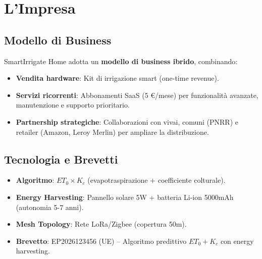 \documentclass[11pt,a4paper]{report}
\begin{document}
\chapter{L'Impresa}
\label{ch:company}

\section{Modello di Business}
SmartIrrigate Home adotta un {\bf modello di business ibrido}, combinando:
\begin{itemize}
\item {\bf Vendita hardware}: Kit di irrigazione smart (one-time revenue).
\item {\bf Servizi ricorrenti}: Abbonamenti SaaS (5 €/mese) per funzionalità avanzate, manutenzione e supporto prioritario.
\item {\bf Partnership strategiche}: Collaborazioni con vivai, comuni (PNRR) e retailer (Amazon, Leroy Merlin) per ampliare la distribuzione.
\end{itemize}

\section{Tecnologia e Brevetti}
\begin{itemize}
\item {\bf Algoritmo}: $ET_0 \times K_c$ (evapotraspirazione + coefficiente colturale).
\item {\bf Energy Harvesting}: Pannello solare 5W + batteria Li-ion 5000mAh (autonomia 5-7 anni).
\item {\bf Mesh Topology}: Rete LoRa/Zigbee (copertura 50m).
\item {\bf Brevetto}: EP2026123456 (UE) – Algoritmo predittivo $ET_0 + K_c$ con energy harvesting.
\end{itemize}
\end{document}
